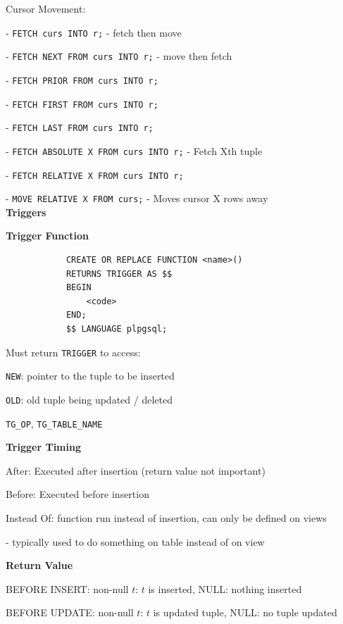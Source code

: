 \documentclass[10pt, a4paper]{article}
\newcommand{\red}[1]{{\color{red}#1}}
\newcommand{\header}[1]{{\normalsize\textbf{#1}}}
\newcommand{\tab}[0]{\hspace*{2mm}}
\begin{document}
\begin{multicols*}{3}
		Cursor Movement:

		- \texttt{FETCH curs INTO r;} - fetch then move

		- \texttt{FETCH NEXT FROM curs INTO r;} - move then fetch

		- \texttt{FETCH PRIOR FROM curs INTO r;} 

		- \texttt{FETCH FIRST FROM curs INTO r;} 

		- \texttt{FETCH LAST FROM curs INTO r;} 

		- \texttt{FETCH ABSOLUTE X FROM curs INTO r;} - Fetch Xth tuple

		- \texttt{FETCH RELATIVE X FROM curs INTO r;} 

		- \texttt{MOVE RELATIVE X FROM curs;} - Moves cursor X rows away\\
		
		\header{Triggers}

		\textbf{Trigger Function}
		\begin{verbatim}
			CREATE OR REPLACE FUNCTION <name>() 
			RETURNS TRIGGER AS $$
			BEGIN 
			    <code>
			END;
			$$ LANGUAGE plpgsql;
		\end{verbatim}
		Must return \texttt{TRIGGER} to access:

		\texttt{NEW}: pointer to the tuple to be inserted

		\texttt{OLD}: old tuple being updated / deleted

		\texttt{TG\_OP}, \texttt{TG\_TABLE\_NAME}
		

		\textbf{Trigger Timing}

		After: Executed after insertion (return value not important)

		Before: Executed before insertion

		Instead Of: function run instead of insertion, can only be \red{defined on views}
		
		\tab - typically used to do something on table instead of on view

		\textbf{Return Value}
		
		BEFORE INSERT: non-null $t$: $t$ is inserted, NULL: nothing inserted  

		BEFORE UPDATE: non-null $t$: $t$ is updated tuple, NULL: no tuple updated


\end{multicols*}
\end{document}
